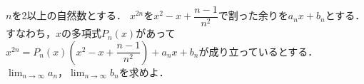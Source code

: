 \documentclass[../../main.tex]{subfiles}
\begin{document}
$n$を2以上の自然数とする．
$x^{2n}$を$\displaystyle x^2-x+\dfrac{n-1}{n^2}$で割った余りを$a_nx+b_n$とする．
すなわち，$x$の多項式$P_n(x)$があって
$\displaystyle x^{2n}=P_n(x) \left( x^2-x+\dfrac{n-1}{n^2} \right) +a_nx+b_n$が成り立っているとする．
$\displaystyle\lim_{n\to\infty}a_n$，$\displaystyle\lim_{n\to\infty}b_n$を求めよ．
\end{document}
